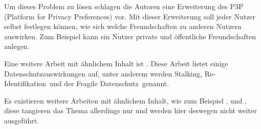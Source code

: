 Um dieses Problem zu lösen schlagen die Autoren eine Erweiterung des P3P (Platform for Privacy Preferences) vor. Mit dieser Erweiterung soll jeder Nutzer selbst festlegen können, wie sich welche Freundschaften zu anderen Nutzern auswirken. Zum Beispiel kann ein Nutzer private und öffentliche Freundschaften anlegen.

Eine weitere Arbeit mit ähnlichem Inhalt ist \citet{gross2005information}. Diese Arbeit listet einige Datenschutzauswirkungen auf, unter anderem werden \glqq Stalking\grqq , \glqq Re-Identifikation\grqq\ und der \glqq Fragile Datenschutz\grqq\ genannt.

Es existieren weitere Arbeiten mit ähnlichem Inhalt, wie zum Beispiel \citet{hintz2014AGB}, \citet{mahmood2011privacy} und \citet{hintzPhishing}, diese tangieren das Thema allerdings nur und werden hier deswegen nicht weiter ausgeführt.